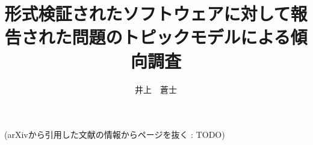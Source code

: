 \documentclass[a4j,12pt,twoside]{jreport}
\author{井上　蒼士}
\title{形式検証されたソフトウェアに対して報告された\coverbreak 問題の\abstbreak トピックモデルによる傾向調査}
\begin{document}
\maketitle



\begin{contents}
\tableofcontents
\end{contents}





% 
% 



(arXivから引用した文献の情報からページを抜く : TODO)

% 
\end{document}
